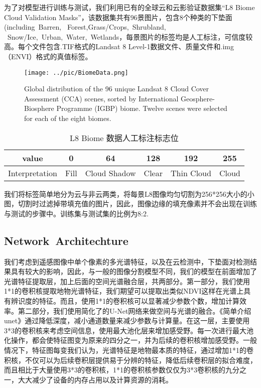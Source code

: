 \documentclass[UTF8]{ctexart}
\begin{document}
为了对模型进行训练与测试，我们利用已有的全球云和云影验证数据集“L8 Biome Cloud Validation Masks”\cite{foga2017cloud_data}，该数据集共有96景图片，包含8个种类的下垫面(including Barren, 
Forest,Grass/Crops, Shrubland,
 Snow/Ice, Urban, Water, Wetlands，每景图片的标签均是人工标注，可信度较高。每个文件包含.TIF格式的Landsat 8 Level-1数据文件、质量文件和.img（ENVI）格式的真值标签。

\begin{figure}[ht]
    \centering
    \texttt{[image: ../pic/BiomeData.png]}
    \caption{Global distribution of the 96 unique Landsat 8 Cloud Cover Assessment (CCA) scenes, sorted by International Geosphere-Biosphere Programme (IGBP) biome. Twelve scenes were selected for each of the eight biomes.}
    \label{fig:label}
    \end{figure}

\begin{table}[ht]
    \centering
    \begin{tabular}{c|ccccc}
    \hline
    \hline
    value& 0& 64& 128& 192& 255\\
    \hline
    Interpretation&	Fill& Cloud Shadow& Clear &Thin Cloud& Cloud\\
    \hline
    \hline
    \end{tabular}
    \caption{L8 Biome 数据人工标注标志位}
    \end{table}

我们将标签简单地分为云与非云两类，将每景L8图像均匀切割为256*256大小的小图，切割时过滤掉带填充值的图片，因此，图像边缘的填充像素并不会出现在训练与测试的步骤中。训练集与测试集的比例为8:2.

\subsection{Network Architechture}

我们考虑到遥感图像中单个像素的多光谱特征，以及在云检测中，下垫面对检测结果具有较大的影响，因此，与一般的图像分割模型不同，我们的模型在前面增加了光谱特征提取层，加上后面的空间光谱融合层，共两部分。第一部分，我们使用1*1的卷积核提取地物光谱特征，我们期望可以提取出类似NDVI这样在光谱上具有辨识度的特征。而且，使用1*1的卷积核可以显著减少参数个数，增加计算效率。第二部分，我们使用简化了的U-Net网络来做空间与光谱的融合。《简单介绍unet》通过降低深度，减小通道数量来减少参数与计算量。在这一层，主要使用3*3的卷积核来考虑空间信息，使用最大池化层来增加感受野。每一次进行最大池化操作，都会使特征图变为原来的四分之一，并为后续的卷积核增加感受野。一般情况下，特征图每变我们认为，光谱特征是地物最本质的特征，通过增加1*1的卷积核，不仅可以为后续卷积层提供易于分辨的特征，降低后续卷积层的拟合难度，而且相比于大量使用3*3的卷积核，1*1的卷积核参数仅仅为3*3卷积核的九分之一，大大减少了设备的内存占用以及计算资源的消耗。
\end{document}
